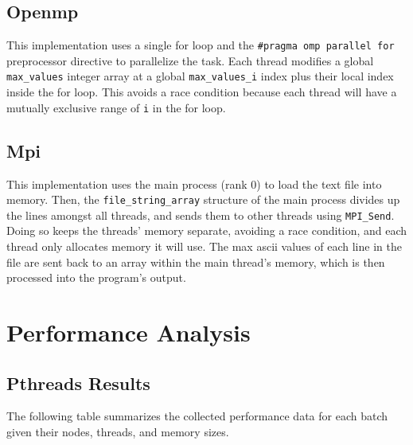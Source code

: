 \documentclass{article}
\begin{document}
\subsection*{Openmp}

This implementation uses a single for loop and the \texttt{\#pragma omp parallel for} preprocessor directive to parallelize the task. Each thread modifies a global \texttt{max\_values} integer array at a global \texttt{max\_values\_i} index plus their local index inside the for loop. This avoids a race condition because each thread will have a mutually exclusive range of \texttt{i} in the for loop.

\subsection*{Mpi}

This implementation uses the main process (rank 0) to load the text file into memory. Then, the \texttt{file\_string\_array} structure of the main process divides up the lines amongst all threads, and sends them to other threads using \texttt{MPI\_Send}. Doing so keeps the threads’ memory separate, avoiding a race condition, and each thread only allocates memory it will use. The max ascii values of each line in the file are sent back to an array within the main thread’s memory, which is then processed into the program’s output.

\section*{Performance Analysis}

\subsection*{Pthreads Results}

The following table summarizes the collected performance data for each batch given their nodes, threads, and memory sizes.
\end{document}
